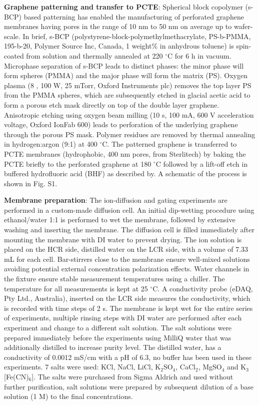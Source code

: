 \documentclass[journal=langd5,email=true, hyperref=true, keywords=false]{achemso}
\newcommand{\Fig}{Fig.}
\begin{document}
\vspace{1em}
\noindent
\textbf{Graphene patterning and transfer to PCTE}: Spherical block
copolymer (s-BCP) based patterning has enabled the manufacturing of
perforated graphene membranes having pores in the range of 10 nm to 50
nm on average up to wafer-scale\cite{Choi_2018}. In brief, s-BCP
(polystyrene-block-polymethylmethacrylate, PS-b-PMMA, 195-b-20,
Polymer Source Inc, Canada, 1 weight\% in anhydrous toluene) is
spin-coated from solution and thermally annealed at 220 $^{\circ}$C
for 6 h in vacuum. Microphase separation of s-BCP leads to distinct
phases: the minor phase will form spheres (PMMA) and the major phase
will form the matrix (PS). Oxygen plasma (8 , 100 W, 25 mTorr, Oxford
Instruments plc) removes the top layer PS from the PMMA spheres, which
are subsequently etched in glacial acetic acid to form a porous
etch mask directly on top of the double layer graphene. Anisotropic
etching using oxygen beam milling (10 s, 100 mA, 600 V acceleration
voltage, Oxford IonFab 600) leads to perforation of the underlying
graphene through the porous PS mask. Polymer residues are removed by
thermal annealing in hydrogen:argon (9:1) at 400 $^{\circ}$C. The
patterned graphene is transferred to PCTE membranes (hydrophobic, 400
nm pores, from Sterlitech) by baking the PCTE briefly to the
perforated graphene at 180 $^{\circ}$C followed by a lift-off etch in
buffered hydrofluoric acid (BHF) as described by\cite{Choi_2018}. A
schematic of the process is shown in \Fig{} S1.

\vspace{1em}
\noindent
\textbf{Membrane preparation}: The ion-diffusion and gating experiments are
performed in a custom-made diffusion cell. An initial dip-wetting
procedure using ethanol/water 1:1 is performed to wet the membrane,
followed by extensive washing and inserting the membrane. The
diffusion cell is filled immediately after mounting the membrane with
DI water to prevent drying. The ion solution is placed on the HCR
side, distilled water on the LCR side, with a volume of 7.33 mL for
each cell. Bar-stirrers close to the membrane ensure well-mixed
solutions avoiding potential external concentration polarization
effects. Water channels in the fixture ensure stable measurement
temperatures using a chiller. The temperature for all measurements is
kept at 25 $^{\circ}$C. A conductivity probe (eDAQ, Pty Ltd.,
Australia), inserted on the LCR side measures the conductivity, which
is recorded with time steps of 2 s. The membrane is kept wet for the
entire series of experiments, multiple rinsing steps with DI water are
performed after each experiment and change to a different salt
solution. The salt solutions were prepared immediately before the
experiments using MilliQ water that was additionally distilled to
increase purity level. The distilled water, has a conductivity of
0.0012 mS/cm with a pH of 6.3, no buffer has been used in these
experiments. 7 salts were used: KCl, NaCl, LiCl, K$_{2}$SO$_{4}$,
CaCl$_{2}$, MgSO$_{4}$ and K$_{3}$[Fe(CN)$_{6}$]. The salts were
purchased from Sigma Aldrich and used without further purification,
salt solutions were prepared by subsequent dilution of a base solution
(1 M) to the final concentrations.
\end{document}
